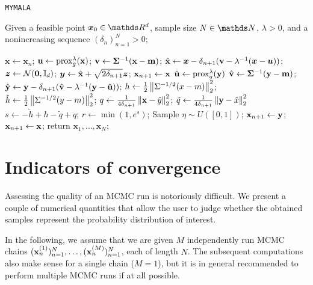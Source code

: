\documentclass[10pt]{article}
\numberwithin{equation}{section}
\begin{document}
\begin{algorithm}[H]
\caption{\texttt{MYMALA}}
Given a feasible point $\bm x_0 \in \R^d$, sample size $N \in \N$, $\lambda > 0$, and a nonincreasing sequence $(\delta_n)_{n=1}^N > 0$;
\begin{algorithmic}[2]\label{alg:mymala}
\State $\bm x \gets \bm x_n$;
\State $\mathbf{u} \gets \text{prox}_{g}^{\lambda}(\mathbf{x})$;
\State $\mathbf{v} \gets \mathbf{\Sigma}^{-1}(\mathbf{x} - \mathbf{m})$;
\State $\hat{\mathbf{x}} \gets \bm x - \delta_{n+1} (\mathbf{v} - \lambda^{-1}(\bm x - \bm u))$;
\State $\bm z \gets \mathcal{N}(\bm 0, \mathbb{I}_d)$;
\State $\bm y \gets \hat{\mathbf{x}} + \sqrt{2 \delta_{n+1}} \bm z$;
\State $\mathbf{x}_{n+1} \gets \mathbf{x}$
\Else
\State $\hat{\mathbf{u}} \gets \text{prox}_{g}^{\lambda}(\mathbf{y})$
\State $\hat{\mathbf{v}} \gets \mathbf{\Sigma}^{-1}(\mathbf{y} - \mathbf{m})$;
\State $\hat{\mathbf{y}} \gets \mathbf{y} - \delta_{n+1} (\hat{\mathbf{v}} - \lambda^{-1}(\mathbf{y} - \hat{\mathbf{u}}))$;
\State $h \gets \frac{1}{2}\left\|\Sigma^{-1/2}(x-m)\right\|_2^2$;
\State $\tilde h \gets \frac{1}{2} \left\|\Sigma^{-1/2}(y-m)\right\|_2^2$;
\State $q \gets \frac{1}{4 \delta_{n+1}} \left\|\mathbf{x} - \hat y\right\|_2^2$;
\State $\tilde q \gets \frac{1}{4 \delta_{n+1}} \left\|\mathbf{y} - \hat x\right\|_2^2$
\State $s \gets - \tilde h + h - \tilde q + q$;
\State $r \gets \min(1, e^s)$;
\State Sample $\eta \sim U([0,1])$;
\State $\mathbf{x}_{n+1} \gets \mathbf{y}$;
\Else
\State $\mathbf{x}_{n+1} \gets \mathbf{x}$;
\EndIf
\EndIf
\EndFor
\State return $\bm x_1, \ldots, \bm x_N$;
\end{algorithmic}
\end{algorithm}



\section{Indicators of convergence}

Assessing the quality of an MCMC run is notoriously difficult. We present a couple of numerical quantities that allow the user to judge whether the obtained samples represent the probability distribution of interest.

In the following, we assume that we are given $M$ independently run MCMC chains $(\mathbf{x}_n^{(1)})_{n=1}^N, \ldots, (\mathbf{x}_n^{(M)})_{n=1}^N$, each of length $N$. The subsequent computations also make sense for a single chain ($M=1$), but it is in general recommended to perform multiple MCMC runs if at all possible.
\end{document}
